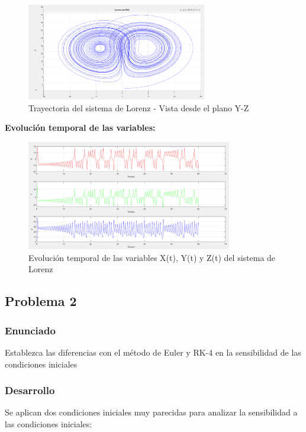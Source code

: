 \documentclass[a4paper,12pt]{article}
\theoremstyle{mytheor}
\begin{document}
\begin{figure}[H]
    \centering
    \includegraphics[width=0.7\textwidth]{g4.png}
    \caption{Trayectoria del sistema de Lorenz - Vista desde el plano Y-Z}
    \label{fig:lorenz_yz}
\end{figure}

\vspace{0.5cm}

\textbf{Evolución temporal de las variables:}

\begin{figure}[H]
    \centering
    \includegraphics[width=0.8\textwidth]{g5.png}
    \caption{Evolución temporal de las variables X(t), Y(t) y Z(t) del sistema de Lorenz}
    \label{fig:lorenz_temporal}
\end{figure}

\subsection{Problema 2}
\subsubsection{Enunciado}
Establezca las diferencias con el método de Euler y RK-4 en la sensibilidad de las condiciones
iniciales

\subsubsection{Desarrollo}
Se aplican dos condiciones iniciales muy parecidas para analizar la sensibilidad a las condiciones iniciales:
\end{document}
